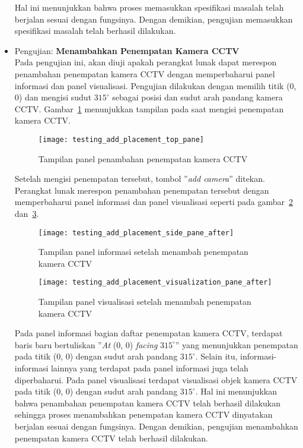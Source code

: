 \begin{itemize}
	Hal ini menunjukkan bahwa proses memasukkan spesifikasi masalah telah berjalan sesuai dengan fungsinya. Dengan demikian, pengujian memasukkan spesifikasi masalah telah berhasil dilakukan.
	
	\item Pengujian: \textbf{Menambahkan Penempatan Kamera CCTV}\\
	Pada pengujian ini, akan diuji apakah perangkat lunak dapat merespon penambahan penempatan kamera CCTV dengan memperbaharui panel informasi dan panel visualisasi. Pengujian dilakukan dengan memilih titik (0, 0) dan mengisi sudut \(315^\circ\) sebagai posisi dan sudut arah pandang kamera CCTV. Gambar~\ref{fig:testing_add_placement_top_pane} menunjukkan tampilan pada saat mengisi penempatan kamera CCTV.
	
	\begin{figure}[H]
		\centering  
		\texttt{[image: testing\_add\_placement\_top\_pane]}
		\caption[Tampilan panel penambahan penempatan kamera CCTV]{Tampilan panel penambahan penempatan kamera CCTV}
		\label{fig:testing_add_placement_top_pane}
	\end{figure}
	
	 Setelah mengisi penempatan tersebut, tombol ''\textit{add camera}'' ditekan. Perangkat lunak merespon penambahan penempatan tersebut dengan memperbaharui panel informasi dan panel visualisasi seperti pada gambar~\ref{fig:testing_add_placement_side_pane_after} dan~\ref{fig:testing_add_placement_visualization_pane_after}. 
	 
	 \begin{figure}[H]
		\centering  
		\texttt{[image: testing\_add\_placement\_side\_pane\_after]}
		\caption[Tampilan panel informasi setelah menambah penempatan kamera CCTV]{Tampilan panel informasi setelah menambah penempatan kamera CCTV}
		\label{fig:testing_add_placement_side_pane_after}
	\end{figure}
	
	\begin{figure}[H]
		\centering  
		\texttt{[image: testing\_add\_placement\_visualization\_pane\_after]}
		\caption[Tampilan panel visualisasi setelah menambah penempatan kamera CCTV]{Tampilan panel visualisasi setelah menambah penempatan kamera CCTV}
		\label{fig:testing_add_placement_visualization_pane_after}
	\end{figure}
	 
	 Pada panel informasi bagian daftar penempatan kamera CCTV, terdapat baris baru bertuliskan ''\textit{At} (0, 0) \textit{facing} \(315^\circ\)'' yang menunjukkan penempatan pada titik (0, 0) dengan sudut arah pandang \(315^\circ\). Selain itu, informasi-informasi lainnya yang terdapat pada panel informasi juga telah diperbaharui. Pada panel visualisasi terdapat visualisasi objek kamera CCTV pada titik (0, 0) dengan sudut arah pandang \(315^\circ\). Hal ini menunjukkan bahwa penambahan penempatan kamera CCTV telah berhasil dilakukan sehingga proses menambahkan penempatan kamera CCTV dinyatakan berjalan sesuai dengan fungsinya. Dengan demikian, pengujian menambahkan penempatan kamera CCTV telah berhasil dilakukan.
	

\end{itemize}
